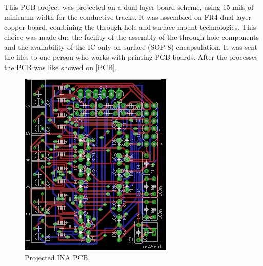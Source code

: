 This PCB project was projected on a dual layer board scheme, using 15 mils of
minimum width for the conductive tracks. It was assembled on FR4 dual layer copper
board, combining the through-hole and surface-mount technologies. This choice was
made due the facility of the assembly of the through-hole components and the availability
of the IC only on surface (SOP-8) encapsulation. It was sent
the files to one person who works with printing PCB boards. After the processes
the PCB was like showed on \autoref{PCB}.\\

\begin{figure}[!htpb]
\centering
\caption{Projected INA PCB}
\label{INA_PCB}
\includegraphics[scale=1.8]{images/TCC_INA}
\end{figure}

